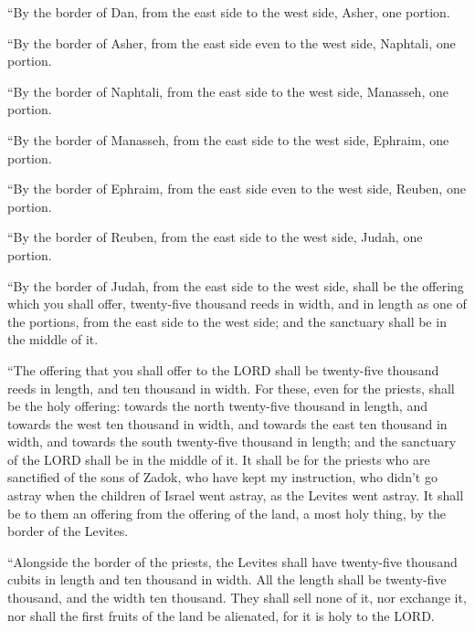  ``By the border of Dan, from the east side to the west
side, Asher, one portion.

 ``By the border of Asher, from the east side even to the
west side, Naphtali, one portion.

 ``By the border of Naphtali, from the east side to the west
side, Manasseh, one portion.

 ``By the border of Manasseh, from the east side to the west
side, Ephraim, one portion.

 ``By the border of Ephraim, from the east side even to the
west side, Reuben, one portion.

 ``By the border of Reuben, from the east side to the west
side, Judah, one portion.

 ``By the border of Judah, from the east side to the west
side, shall be the offering which you shall offer, twenty-five thousand
reeds in width, and in length as one of the portions, from the east side
to the west side; and the sanctuary shall be in the middle of it.

 ``The offering that you shall offer to the LORD shall be
twenty-five thousand reeds in length, and ten thousand in width.
 For these, even for the priests, shall be the holy
offering: towards the north twenty-five thousand in length, and towards
the west ten thousand in width, and towards the east ten thousand in
width, and towards the south twenty-five thousand in length; and the
sanctuary of the LORD shall be in the middle of it.  It
shall be for the priests who are sanctified of the sons of Zadok, who
have kept my instruction, who didn't go astray when the children of
Israel went astray, as the Levites went astray.  It shall
be to them an offering from the offering of the land, a most holy thing,
by the border of the Levites.

 ``Alongside the border of the priests, the Levites shall
have twenty-five thousand cubits in length and ten thousand in width.
All the length shall be twenty-five thousand, and the width ten
thousand.  They shall sell none of it, nor exchange it, nor
shall the first fruits of the land be alienated, for it is holy to the
LORD.

